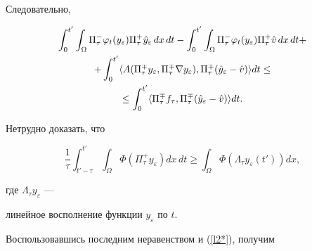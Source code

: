Следовательно,


\begin{gather}


 \int^{t'}_{0} \int_{\Omega}


 \Pi^{-}_{\tau} \varphi_t(y_\varepsilon) \Pi^{+}_{\tau}\Hat{y}_\varepsilon


\, dx\, dt -


 \int^{t'}_{0} \int_{\Omega}


 \Pi^{-}_{\tau} \varphi_t(y_\varepsilon) \Pi^{+}_{\tau}\Hat{v}\,  dx\, dt+


\notag\\


%


 + \int^{t'}_{0} \langle A(\Pi^{\mp}_{\tau}y_\varepsilon,


 \Pi^{\mp}_{\tau} \nabla y_\varepsilon),


 \Pi^{\mp}_{\tau} (\Hat{y}_\varepsilon - \Hat{v} ) \rangle dt \le\notag\\


%


\le \int^{t'}_{0} \langle \Pi^{\mp}_{\tau} f_\tau,


  \Pi^{\mp}_{\tau} (\Hat{y}_\varepsilon - \Hat{v} )  \rangle dt.


  \label{6.2}


\end{gather}


Нетрудно доказать, что


$$


 \frac{1}{\tau} \int^{t'}_{t' -\tau} \int_{\Omega}


\Phi( \Pi^{+}_{\tau}y_\varepsilon) dx\, dt \ge


\int_{\Omega} \Phi(\Lambda_\tau y_\varepsilon (t'))dx,


$$


где $ \Lambda_\tau y_\varepsilon$ ---


линейное восполнение функции $y_\varepsilon$ по $t$. 


Воспользовавшись последним неравенством и (\ref{l2*}), получим


